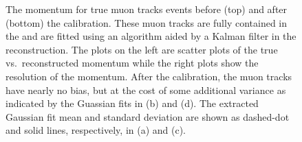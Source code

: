 \begin{figure}
    \begin{centering}
        \caption[Momentum Calibration for \podtitle{} Fully Contained Muon Tracks]{The momentum for true muon tracks events before (top) and after (bottom) the calibration. These muon tracks are fully contained in the \podtext{} and are fitted using an algorithm aided by a Kalman filter in the \podtext{} reconstruction. The plots on the left are scatter plots of the true vs.\ reconstructed momentum while the right plots show the resolution of the momentum. After the calibration, the muon tracks have nearly no bias, but at the cost of some additional variance as indicated by the Guassian fits in (b) and (d). The extracted Gaussian fit mean and standard deviation are shown as dashed-dot and solid lines, respectively, in (a) and (c).\label{fig:MuonContainedCalibration}}
    \end{centering}
\end{figure}

